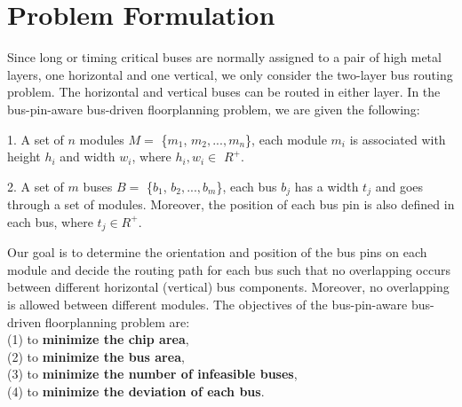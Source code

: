\chapter{Problem Formulation}
\label{chap::PROBLEM FORMULATION}

\baselineskip=26pt

\hspace{5mm}Since long or timing
critical buses are normally assigned to a pair of high metal
layers, one horizontal and one vertical, we only consider the
two-layer bus routing problem. The horizontal and vertical buses
can be routed in either layer. In the bus-pin-aware bus-driven
floorplanning problem, we are given the following:

1. A set of $n$ modules $M =$ \{$m_1$, $m_2,..., m_n$\}, each module $m_i$
is associated with height $h_i$ and width $w_i$, where $h_i, w_i \in$
$R^+$.

2. A set of $m$ buses $B =$ \{$b_1$, $b_2,..., b_m$\}, each bus $b_j$ has a
width $t_j$ and goes through a set of modules. Moreover, the
position of each bus pin is also defined in each bus, where
$t_j \in R^+$.

Our goal is to determine the orientation and position of the bus pins
on each module and decide the routing path for each bus such
that no overlapping occurs between different horizontal (vertical)
bus components.
Moreover, no overlapping is allowed between different modules.
The objectives of the bus-pin-aware bus-driven floorplanning problem are:\\
(1) to {\bf minimize the chip area},\\
(2) to {\bf minimize the bus area},\\
(3) to {\bf minimize the number of infeasible buses},\\
(4) to {\bf minimize the deviation of each bus}.\\
